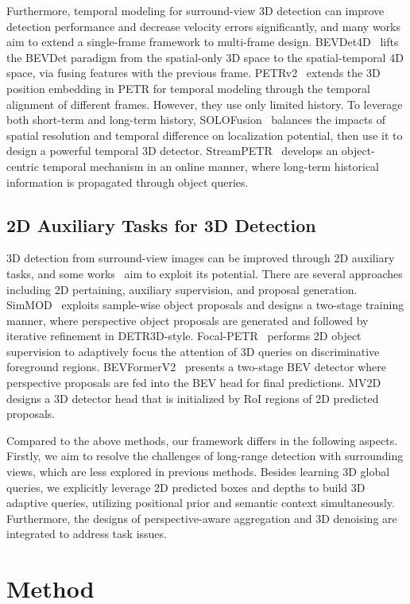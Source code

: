 \documentclass[letterpaper]{article} \usepackage{aaai24}
\begin{document}
Furthermore, temporal modeling for surround-view 3D detection can improve detection performance and decrease velocity errors significantly, and many works~\cite{huang2022bevdet4d, liu2022petrv2, park2022time, wang2023exploring, lin2022sparse4d, lin2023sparse4dv2} aim to extend a single-frame framework to multi-frame design. 
BEVDet4D~\cite{huang2022bevdet4d} lifts the BEVDet paradigm from the spatial-only 3D space to the spatial-temporal 4D space, via fusing features with the previous frame.
PETRv2~\cite{liu2022petrv2} extends the 3D position embedding in PETR for temporal modeling through the temporal alignment of different frames. 
However, they use only limited history.
To leverage both short-term and long-term history, SOLOFusion~\cite{park2022time} balances the impacts of spatial resolution and temporal difference on localization potential, then use it to design a powerful temporal 3D detector.
StreamPETR~\cite{wang2023exploring} develops an object-centric temporal mechanism in an online manner, where long-term historical information is propagated through object queries.

\subsection{2D Auxiliary Tasks for 3D Detection}
3D detection from surround-view images can be improved through 2D auxiliary tasks, and some works~\cite{xie2022m, zhang2023simple, wang2022focal, yang2023bevformer, wang2023object} aim to exploit its potential. There are several approaches including 2D pertaining, auxiliary supervision, and proposal generation. 
SimMOD~\cite{zhang2023simple} exploits sample-wise object proposals and designs a two-stage training manner, where perspective object proposals are generated and followed by iterative refinement in DETR3D-style.
Focal-PETR~\cite{wang2022focal} performs 2D object supervision to adaptively focus the attention of 3D queries on discriminative foreground regions.
BEVFormerV2~\cite{yang2023bevformer} presents a two-stage BEV detector where perspective proposals are fed into the BEV head for final predictions.
MV2D~\cite{wang2023object} designs a 3D detector head that is initialized by RoI regions of 2D predicted proposals.


Compared to the above methods, our framework differs in the following aspects. Firstly, we aim to resolve the challenges of long-range detection with surrounding views, which are less explored in previous methods.
Besides learning 3D global queries, we explicitly leverage 2D predicted boxes and depths to build 3D adaptive queries, utilizing positional prior and semantic context simultaneously. Furthermore, the designs of perspective-aware aggregation and 3D denoising are integrated to address task issues. \section{Method}
\end{document}
